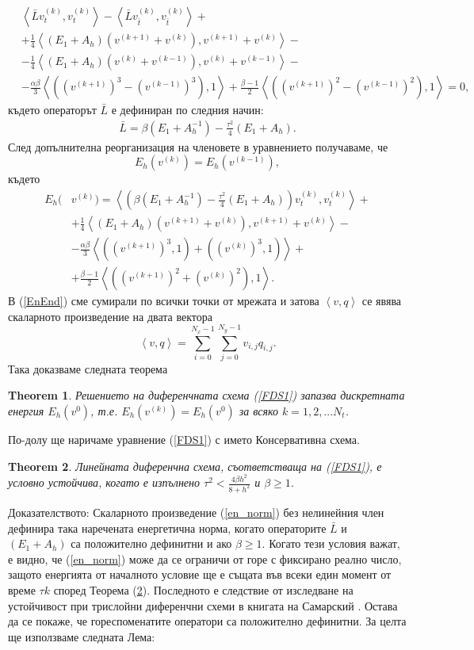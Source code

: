 \documentclass[a4paper]{article}
\newcommand{\be}{\begin{equation}}
\newcommand{\ee}{\end{equation}}
\newcommand{\rf}[1]{(\ref{#1})}
\newtheorem{thm}{Theorem}
\theoremstyle{remark}
\begin{document}
\begin{large}
\begin{align}\label{EnEnd}
&\left< \bar L  v_{t}^{(k)}, v_{t}^{(k)} \right> -  \left< \bar L v_{\bar t}^{(k)}, v_{\bar t}^{(k)} \right> + \nonumber \\  
& +\frac{1}{4} \left<  (E_1 +A_h ) \left( v^{(k+1)} + v^{(k)} \right ) , v^{(k+1)} + v^{(k)} \right>  -\nonumber \\
&- \frac{1}{4} \left<  (E_1 +A_h ) \left( v^{(k)} + v^{(k-1)} \right ) , v^{(k)} + v^{(k-1)} \right> - \nonumber \\
&- \frac{\alpha \beta}{3} \left< \left( (v^{(k+1)})^3-(v^{(k-1)})^3 \right), 1 \right> + \frac{\beta - 1}{2} \left< \left( (v^{(k+1)})^2-(v^{(k-1)})^2 \right), 1 \right> =0,
\end{align}
където операторът $\bar L$ е дефиниран по следния начин:
\begin{align}
\bar L = \beta (E_1+A_h^{-1})- \frac{\tau^2}{4}( E_1+A_h ).
\end{align}
	След допълнителна реорганизация на членовете в уравнението получаваме, че
\be \label{num_en}
E_h(v^{(k)}) =E_h(v^{(k-1)}),
\ee
където
\begin{align}\label{en_norm}
E_h(&v^{(k)})=\left< \left( \beta (E_1+A_h^{-1})- \frac{\tau^2}{4}( E_1+A_h ) \right)v_{t}^{(k)} ,v_{t}^{(k)} \right>+ \nonumber\\
&+\frac{1}{4}  \left<  ( E_1+A_h)(v^{(k+1)}+v^{(k)}), v^{(k+1)}+v^{(k)} \right> - \nonumber\\
&- \frac{\alpha \beta}{3} \left< ((v^{(k+1)})^3,1)+((v^{(k)})^3,1) \right> + \nonumber\\
&+\frac{\beta - 1}{2} \left< \left( (v^{(k+1)})^2+(v^{(k)})^2 \right), 1 \right>.
\end{align}
В \rf{EnEnd} сме сумирали по всички точки от мрежата и затова  $\left< v, q \right>$ се явява скаларното произведение на двата вектора 
\be\label{dotProd}
\left<v, q \right> = \sum_{i=0}^{N_x-1} \sum_{j=0}^{N_y-1} v_{i,j} q_{i,j}.
\ee
Така доказваме следната теорема
\begin{thm}\label{th0}
Решението на диференчната схема \rf{FDS1} запазва дискретната енергия $E_h(v^0)$, т.е.  $E_h(v^{(k)}) =E_h(v^{0})$ за всяко $k=1,2,...N_t$.
\end{thm}
По-долу ще наричаме уравнение \rf{FDS1} с името Консервативна схема.
\begin{thm}\label{th1}
Линейната диференчна схема, съответстваща на \rf{FDS1}, е условно устойчива, когато е изпълнено
$\tau^2 < \frac{4 \beta h^2}{8 + h^2}$ и $\beta \ge 1$.
\end{thm}
Доказателството:
Скаларното произведение \rf{en_norm} без нелинейния член дефинира така наречената енергетична норма, когато операторите $\bar{L}$ и $(E_1 + A_h)$ са положително дефинитни и ако $\beta \ge 1$. Когато тези условия важат, е видно, че \rf{en_norm} може да се ограничи от горе с фиксирано реално число, защото енергията от началното условие ще е същата във всеки един момент от време $\tau k$ според Теорема \rf{th1}. Последното е следствие от изследване на устойчивост при трислойни диференчни схеми в книгата на Самарский \cite{samarski}. Остава да се покаже, че гореспоменатите оператори са положително дефинитни. За целта ще използваме следната Лема:


\end{large}
\end{document}
